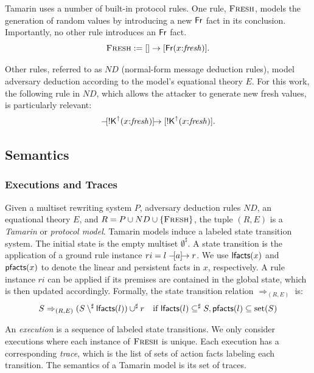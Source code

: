 Tamarin uses a number of built-in protocol rules.
One rule, $\textnormal{\textsc{Fresh}}$, models the generation of random values by introducing a new $\mathsf{Fr}$ fact in its conclusion.
Importantly, no other rule introduces an $\mathsf{Fr}$ fact.
\[
  \textnormal{\textsc{Fresh}} := [] \rightarrow [ \mathsf{Fr}(x{:}\mathit{fresh}) ].
\]

Other rules, referred to as $ND$ (normal-form message deduction rules), model adversary deduction according to the model's equational theory $E$.
For this work, the following rule in $ND$, which allows the attacker to generate new fresh values, is particularly relevant:
\begin{gather*}
  [ \Fr(\ofsort{x}{\fresh}) ] \lrule{\Kup(\ofsort{x}{\fresh})} [ \Kup(\ofsort{x}{\fresh}) ].
\end{gather*}


\subsection{Semantics}
\label{subsec:semantics}

\subsubsection{Executions and Traces}

Given a multiset rewriting system $P$, adversary deduction rules $ND$, an equational theory $E$, and $R = P \cup ND \cup \{ \textnormal{\textsc{Fresh}} \}$, the tuple $(R,E)$ is a \emph{Tamarin} or \emph{protocol model}.
Tamarin models induce a labeled state transition system.
The initial state is the empty multiset $\emptyset^\sharp$.
A state transition is the application of a ground rule instance $ri = l \mathrel{-\mkern-4mu[a]\mkern-8mu\to} r$.
We use $\textsf{lfacts}(x)$ and $\textsf{pfacts}(x)$ to denote the linear and persistent facts in $x$, respectively.
A rule instance $ri$ can be applied if its premises are contained in the global state, which is then updated accordingly.
Formally, the state transition relation $\Rightarrow_{(R, E)}$ is:
\begin{align*}
  S \Rightarrow_{(R, E)} (S \setminus^\sharp \textsf{lfacts}(l)) \cup^\sharp r && \text{if}~\textsf{lfacts}(l) \subseteq^\sharp S, \textsf{pfacts}(l) \subseteq \mathrm{set}(S)
\end{align*}

An \emph{execution} is a sequence of labeled state transitions.
We only consider executions where each instance of $\textnormal{\textsc{Fresh}}$ is unique.
Each execution has a corresponding \emph{trace}, which is the list of sets of action facts labeling each transition.
The semantics of a Tamarin model is its set of traces.

